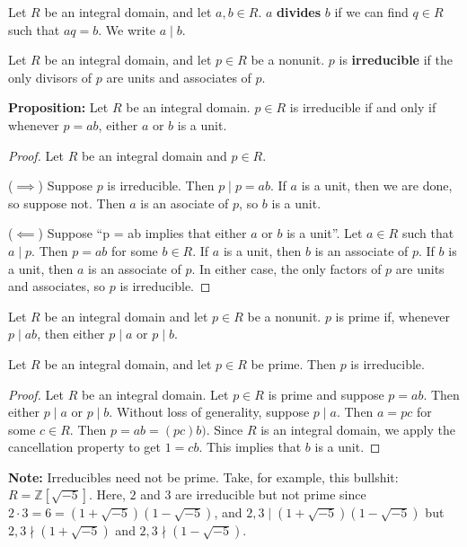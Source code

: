 \documentclass [12pt] {article}
\newcommand{\Z}{\mathbb{Z}}
\newenvironment{definition}[1]{\begin{tcolorbox}[title={Definition: #1},colback=blue!5!white,colframe=black!75!blue]}{\end{tcolorbox}}
\newenvironment{theorem}[1]{\begin{tcolorbox}[title={Theorem #1},colback=green!5!white,colframe=black!75!green]}{\end{tcolorbox}}
\renewcommand{\bf}[1]{\textbf{{#1}}}
\begin{document}
\begin{definition}{Divides (Integral Domains)}
    Let $R$ be an integral domain, and let $a, b \in R$. $a$ \bf{divides} $b$ if we can find
    $q \in R$ such that $aq = b$. We write $a \mid b$.
\end{definition}

\begin{definition}{Irreducible (Integral Domains)}
    Let $R$ be an integral domain, and let $p \in R$ be a nonunit. $p$ is \bf{irreducible} if the
    only divisors of $p$ are units and associates of $p$.
\end{definition}
\bf{Proposition:} Let $R$ be an integral domain. $p \in R$ is irreducible if and only if whenever
$p = ab$, either $a$ or $b$ is a unit.
\begin{proof}
    Let $R$ be an integral domain and $p \in R$.

    ($\implies$)
    Suppose $p$ is irreducible. Then $p \mid p = ab$. If $a$ is a unit, then we are done, so suppose
    not. Then $a$ is an asociate of $p$, so $b$ is a unit.
    \vspace{0.5em}

    ($\impliedby$)
    Suppose ``p = ab implies that either $a$ or $b$ is a unit''. Let $a \in R$ such that $a \mid p$.
    Then $p = ab$ for some $b \in R$. If $a$ is a unit, then $b$ is an associate of $p$. If $b$ is
    a unit, then $a$ is an associate of $p$. In either case, the only factors of $p$ are units and
    associates, so $p$ is irreducible.
\end{proof}

\begin{definition}{Prime (Integral Domains)}
    Let $R$ be an integral domain and let $p \in R$ be a nonunit. $p$ is prime if, whenever
    $p \mid ab$, then either $p \mid a$ or $p \mid b$.
\end{definition}

\begin{theorem}{}
    Let $R$ be an integral domain, and let $p \in R$ be prime. Then $p$ is irreducible.
\end{theorem}
\begin{proof}
    Let $R$ be an integral domain. Let $p \in R$ is prime and suppose $p = ab$. Then either
    $p \mid a$ or $p \mid b$. Without loss of generality, suppose $p \mid a$. Then $a = pc$ for some
    $c \in R$. Then $p = ab = (pc)b)$. Since $R$ is an integral domain, we apply the cancellation
    property to get $1 = cb$. This implies that $b$ is a unit.
\end{proof}
\bf{Note:} Irreducibles need not be prime. Take, for example, this bullshit: $R = \Z[\sqrt{-5}]$.
Here, $2$ and $3$ are irreducible but not prime since
$2 \cdot 3 = 6 = (1 + \sqrt{-5})(1 - \sqrt{-5})$, and $2, 3 \mid (1 + \sqrt{-5})(1 - \sqrt{-5})$
but $2, 3 \nmid (1 + \sqrt{-5})$ and $2, 3 \nmid (1 - \sqrt{-5})$.
\end{document}
